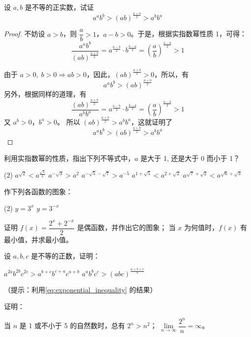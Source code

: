 \begin{example}\label{eq:exponential_inequality}
设 $a,b$ 是不等的正实数，试证
\[a^ab^b>(ab)^{\tfrac{a+b}{2}}>a^bb^a\]
\end{example}

\begin{proof}
不妨设 $a>b$，则 $\dfrac{a}{b}>1$，$a-b>0$。于是，根据实指数幂性质 1，可得：
\[\frac{a^ab^b}{(ab)^{\tfrac{a+b}{2}}}=a^{\tfrac{a-b}{2}}\cdot b^{\tfrac{b-a}{2}}=\left(\frac{a}{b}\right)^{\tfrac{a-b}{2}}>1\]

由于 $a>0,\;  b>0\Rightarrow ab>0$，因此，$(ab)^{\tfrac{a+b}{2}}>0$，所以，有
\[a^ab^b>(ab)^{\tfrac{a+b}{2}}\]
另外，根据同样的道理，有
\[\frac{(ab)^{\tfrac{a+b}{2}}}{a^bb^a}=a^{\tfrac{a-b}{2}}\cdot b^{\tfrac{b-a}{2}}=\left(\frac{a}{b}\right)^{\tfrac{a-b}{2}}>1\]
又 $a^b>0$，$b^a>0$。 所以 $(ab)^{\tfrac{a+b}{2}}>a^b b^a$，这就证明了
\[a^ab^b>(ab)^{\tfrac{a+b}{2}}>a^b b^a\]
\end{proof}

\begin{Exercise}
\begin{question}
  \item 利用实指数幂的性质，指出下列不等式中，$a$ 是大于 1, 还是大于 0 而小于 1？
  \begin{tasks}(2)
    \task $a^{\sqrt{2}}<a^{\tfrac{\sqrt{2}}{2}}$
    \task $a^{-\sqrt{3}}>a^2$
    \task $a^{-\sqrt{5}-\sqrt{7}}>a^{-5}$
    \task $a^{1+\sqrt{5}}<a^{2+\sqrt{2}}$
    \task $a^{\sqrt{7}+\sqrt{2}}<a^{\sqrt{6}+\sqrt{3}}$
  \end{tasks}
  \item 作下列各函数的图象：
  \begin{tasks}(2)
    \task $y=3^x$
    \task $y=3^{-x}$
  \end{tasks}
  \item 
  \begin{tasks}
    \task 证明 $f(x)=\dfrac{2^x+2^{-x}}{2}$ 是偶函数，并作出它的图象；
    \task 当 $x$ 为何值时，$f(x)$ 有最小值，并求最小值。
  \end{tasks}
  \item 设 $a,b,c$ 是不等的正数，证明：
  \begin{tasks}
    \task $a^{2 a} b^{2 b} c^{2 c}>a^{b+c} b^{c+a} c^{a+b}$
    \task $a^{a} b^{b} c^{c}>(a b c)^{\tfrac{a+b+c}{3}}$
  \end{tasks}
  （提示：利用\cref{eq:exponential_inequality} 的结果）
  \item 证明：
  \begin{tasks}
    \task 当 $n$ 是 1 或不小于 5 的自然数时，总有 $2^n>n^2$；
    \task $\lim\limits_{n\to\infty}\dfrac{2^n}{n}=\infty$。
  \end{tasks}
\end{question}
\end{Exercise}

